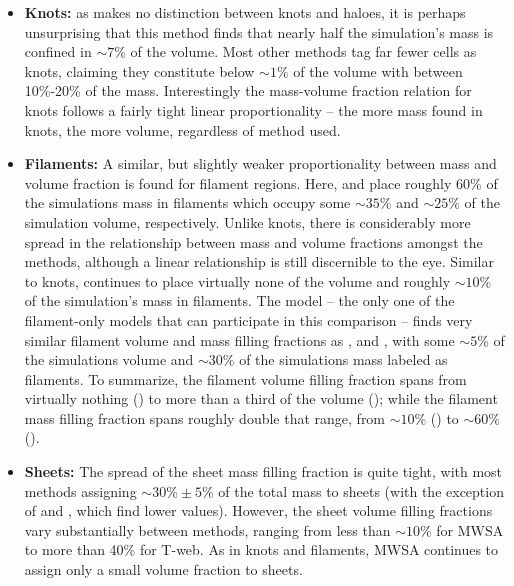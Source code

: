 \begin{itemize} 
\item {\bf Knots:} as \origami{} makes no distinction between knots and haloes, it is perhaps unsurprising that this method finds that nearly half the simulation's mass is confined in $\sim7\%$ of the volume. %
Most other methods tag far fewer cells as knots, claiming they constitute below $\sim1\%$ of the volume with between 10\%-20\% of the mass. Interestingly the mass-volume fraction relation for knots follows a fairly tight linear proportionality -- the more mass found in knots, the more volume, regardless of method used. 
\item {\bf Filaments:} A similar, but slightly weaker proportionality between mass and volume fraction is found for filament regions. Here, \spine{} and \disperse{} place roughly 60\% of the simulations mass in filaments which occupy some $\sim35\%$ and $\sim25\%$ of the simulation volume, respectively. Unlike knots, there is considerably more spread in the relationship between mass and volume fractions amongst the methods, although a linear relationship is still discernible to the eye. Similar to knots, \mswa{} continues to place virtually none of the volume and roughly $\sim10\%$ of the simulation's mass in filaments. The \bisous{} model -- the only one of the filament-only models that can participate in this comparison -- finds very similar filament volume and mass filling fractions as \classic{},  \vweb{} and \mmft{}, with some $\sim5\%$ of the simulations volume and $\sim30\%$ of the simulations mass labeled as filaments. To summarize, the filament volume filling fraction spans from virtually nothing (\mswa{}) to more than a third of the volume (\spine{}); while the filament mass filling fraction spans roughly double that range, from $\sim10\%$ (\mswa{}) to $\sim60\%$ (\disperse{}).
\item {\bf Sheets:} The spread of the sheet mass filling fraction is quite tight, with most methods assigning $\sim30\%\pm5\%$ of the total mass to sheets (with the exception of \origami{} and \mmft{}, which find lower values). However, the sheet volume filling fractions vary substantially between methods, ranging from less than $\sim10\%$ for MWSA to more than 40\% for T-web. As in knots and filaments, MWSA continues to assign only a small volume fraction to sheets.

\end{itemize}
